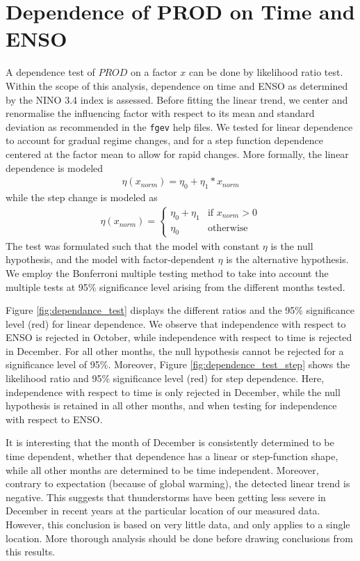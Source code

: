 \documentclass[10pt,conference,compsocconf]{IEEEtran}
\begin{document}
\section*{Dependence of PROD on Time and ENSO}
A dependence test of $PROD$ on a factor $x$ can be done by likelihood ratio test. Within the scope of this analysis, dependence on time and ENSO as determined by the NINO 3.4 index is assessed. Before fitting the linear trend, we center and renormalise the influencing factor with respect to its mean and standard deviation as recommended in the \texttt{fgev} help files. We tested for linear dependence to account for gradual regime changes, and for a step function dependence centered at the factor mean to allow for rapid changes. More formally, the linear dependence is modeled
\begin{align*}
	\eta(x_{norm}) = \eta_0 + \eta_1*x_{norm}
\end{align*}
while the step change is modeled as 
\begin{align*}
	\eta(x_{norm}) = \begin{cases} \eta_0+\eta_1 & \textrm{if } x_{norm}>0\\ \eta_0 & \textrm{otherwise} \end{cases}
\end{align*}
The test was formulated such that the model with constant $\eta$ is the null hypothesis, and the model with factor-dependent $\eta$ is the alternative hypothesis. We employ the Bonferroni multiple testing method to take into account the multiple tests at 95\% significance level arising from the different months tested. 
\par
Figure \ref{fig:dependance_test} displays the different ratios and the 95\% significance level (red) for linear dependence. We observe that independence with respect to ENSO is rejected in October, while independence with respect to time is rejected in December. For all other months, the null hypothesis cannot be rejected for a significance level of 95\%. Moreover, Figure \ref{fig:dependence_test_step} shows the likelihood ratio and 95\% significance level (red) for step dependence. Here, independence with respect to time is only rejected in December, while the null hypothesis is retained in all other months, and when testing for independence with respect to ENSO. 
\par
It is interesting that the month of December is consistently determined to be time dependent, whether that dependence has a linear or step-function shape, while all other months are determined to be time independent. Moreover, contrary to expectation (because of global warming), the detected linear trend is negative. This suggests that thunderstorms have been getting less severe in December in recent years at the particular location of our measured data. However, this conclusion is based on very little data, and only applies to a single location. More thorough analysis should be done before drawing conclusions from this results. 
\end{document}

